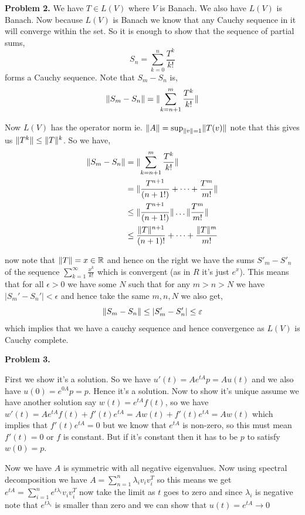 \documentclass[a4paper]{article}
\DeclarePairedDelimiter{\norm}{\lVert}{\rVert}
\begin{document}
\vspace{1em}

\textbf{Problem 2.} We have $T \in L(V)$ where $V$ is Banach. We also have $L(V)$ is Banach. Now because $L(V)$ is Banach we know that any Cauchy sequence in it will converge within the set. So it is enough to show that the sequence of partial sums, 
\[
  S_n = \sum_{k = 0}^{n} \frac{T^{k}}{k!}
\]
forms a Cauchy sequence. Note that $S_m - S_n$  is, 
\[
  \norm{S_m - S_n} = \norm{\sum_{k = n + 1}^{m}  \frac{T^{k}}{k!}}
\]

Now $L(V)$ has the operator norm ie. $\norm{A} = \sup_{\norm{v} =1}\norm{{T(v)}}$ note that this gives us $\norm{T^{k}} \le \norm{T}^{k}$. So we have, 
\begin{align*}
  \norm{S_m - S_n}  &=  \norm{\sum_{k = n + 1}^{m}  \frac{T^{k}}{k!}} \\
                    &= \norm{\frac{T^{n + 1}}{(n + 1!)} + \dots +\frac{T^{m}}{m!}}\\
                    &\le  \norm{\frac{T^{n + 1}}{(n + 1!)}} \dots \norm{\frac{T^{m}}{m!}}\\
                    &\le \frac{\norm{T}^{n + 1}}{(n + 1)!} + \dots  + \frac{\norm{T}^{m}}{m!}\\
\end{align*}

now note that $\norm{T} = x \in \R$  and hence on the right we have the sums $S'_m - S'_n$ of the sequence $\sum_{k = 1}^{\infty} \frac{x^{k}}{k!}$ which is convergent (as in $R$ it's just $e^{x}$). This means that for all $\epsilon > 0$ we have some $N$ such that for any $m >  n > N$  we have $|S_m' - S_n'| < \epsilon$ and hence take the same $m, n, N$ we also get, 
\[
  \norm{S_m - S_n} \le |S_m' - S_n'| \le \epsilon
\]
which implies that we have  a cauchy sequence and hence convergence as $L(V)$ is  Cauchy complete.


\vspace{1em}

\textbf{Problem 3.}

First we show it's a solution. So we have $u'(t) = Ae^{tA}p = A u(t)$ and we also have $u(0) = e^{0A}p = p$. Hence it's a solution. Now to show it's unique assume we have another solution say $w(t) = e^{tA} f(t)$, so we have $w'(t) = Ae^{tA} f(t) + f'(t) e^{tA} = A w(t) + f'(t) e^{tA} = A w(t)$ which implies that $f'(t) e^{tA} = 0$ but we know that $e^{tA}$ is non-zero, so this must mean $f'(t) = 0$ or $f$ is constant. But if it's constant then it has to be $p$ to satisfy $w(0) = p$.

\vspace{1em}

Now we have $A$ is symmetric with all negative eigenvalues. Now using spectral decomposition we have $A = \sum_{n = 1}^{n} \lambda_i v_i v_i^{T}$ so this means we get $e^{tA} = \sum_{i = 1}^{n} e^{t\lambda_i} v_i v_i^{T} $ now take the limit as $t$ goes to zero and since $\lambda_i$ is negative note that $e^{t\lambda_i}$ is smaller than zero and we can show that $u(t) = e^{tA} \to 0$
\end{document}
